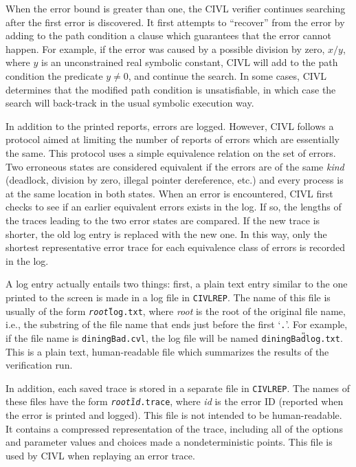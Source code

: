 When the error bound is greater than one, the CIVL verifier continues
searching after the first error is discovered.  It first attempts to
``recover'' from the error by adding to the path condition a clause
which guarantees that the error cannot happen.  For example, if the
error was caused by a possible division by zero, $x/y$, where $y$ is
an unconstrained real symbolic constant, CIVL will add to the path
condition the predicate $y\neq 0$, and continue the search.  In some
cases, CIVL determines that the modified path condition is
unsatisfiable, in which case the search will back-track in the usual
symbolic execution way.

In addition to the printed reports, errors are logged.  However, CIVL
follows a protocol aimed at limiting the number of reports of errors
which are essentially the same.  This protocol uses a simple
equivalence relation on the set of errors.  Two erroneous states are
considered equivalent if the errors are of the same \emph{kind}
(deadlock, division by zero, illegal pointer dereference, etc.) and
every process is at the same location in both states.  When an error
is encountered, CIVL first checks to see if an earlier equivalent
errors exists in the log.  If so, the lengths of the traces leading to
the two error states are compared.  If the new trace is shorter, the
old log entry is replaced with the new one.  In this way, only the
shortest representative error trace for each equivalence class of
errors is recorded in the log.

A log entry actually entails two things: first, a plain text entry
similar to the one printed to the screen is made in a log file in
\texttt{CIVLREP}.  The name of this file is usually of the form
\texttt{\textit{root}{\U}log.txt}, where \textit{root} is the root of
the original file name, i.e., the substring of the file name that ends
just before the first `\texttt{.}'.  For example, if the file name is
\texttt{diningBad.cvl}, the log file will be named
\texttt{diningBad{\U}log.txt}.  This is a plain text, human-readable
file which summarizes the results of the verification run.

In addition, each saved trace is stored in a separate file in
\texttt{CIVLREP}.  The names of these files have the form
\texttt{\textit{root}{\U}\textit{id}.trace}, where \textit{id} is the
error ID (reported when the error is printed and logged).  This file
is not intended to be human-readable.  It contains a compressed
representation of the trace, including all of the options and
parameter values and choices made a nondeterministic points.  
This file is used by CIVL when replaying an error trace.

